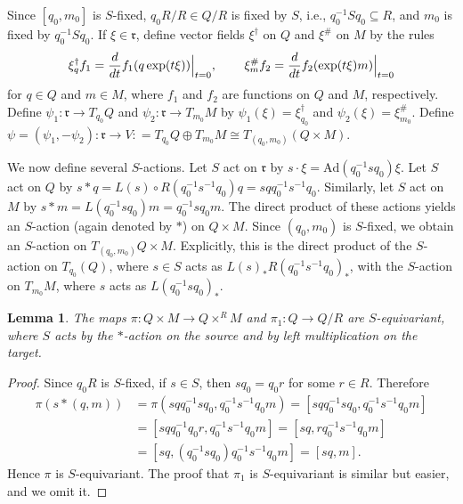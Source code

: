 \documentclass[11pt,letterpaper,reqno]{amsart}
\newcommand{\fr}{{\mathfrak r}}
\numberwithin{equation}{section}
\theoremstyle{plain}
\newtheorem{lemma}[theorem]{Lemma}
\theoremstyle{definition}
\theoremstyle{remark}
\newcommand{\Ad}{\mathrm{Ad}}
\begin{document}
Since $[q_0, m_0]$ is $S$-fixed, $q_0 R/R \in Q/R$ is fixed by $S$, i.e., $q_0^{-1} S q_0 \subseteq R$,
and $m_0$ is fixed by $q_0^{-1} S q_0$.  If $\xi \in \fr$, define vector fields $\xi^{\dagger}$ on $Q$ and $\xi^{\#}$ on $M$ by the rules
\begin{equation}
\xi^{\dagger}_q f_1 = \frac{d}{dt} f_1(q \exp (t \xi)) \Big|_{t=0}, \hspace{.3in} \xi^{\#}_m f_2  = \frac{d}{dt} f_2(\exp (t \xi) m) \Big|_{t=0} 
\end{equation}
for $q\in Q$ and $m\in M$, where $f_1$ and $f_2$ are functions on $Q$ and $M$, respectively.
Define $\psi_1: \fr \to T_{q_0} Q$ and $\psi_2: \fr \to T_{m_0}M$ by $\psi_1(\xi) = {\xi}^{\dagger}_{q_0}$ and
$\psi_2(\xi) = \xi^{\#}_{m_0}$.  Define $\psi = (\psi_1, - \psi_2) : \fr \to V : = T_{q_0} Q \oplus T_{m_0}M \cong T_{(q_0, m_0)} (Q \times M)$.

We now define several $S$-actions.
Let $S$ act on $\fr$ by 
$s \cdot \xi = \Ad (q_0^{-1} s q_0) \xi$.  
Let $S$ act on $Q$ by $s*q = L(s) \circ R(q_0^{-1} s^{-1} q_0) q = s q q_0^{-1} s^{-1} q_0$. 
Similarly, let $S$ act on $M$ by $s*m = L(q_0^{-1} s q_0) m = q_0^{-1} s q_0 m$. 
The direct product of these actions yields an $S$-action (again denoted by $*$) on $Q \times M$.
Since $(q_0,m_0)$ is $S$-fixed, we obtain an $S$-action on $T_{(q_0, m_0)} Q \times M$.
Explicitly, this is the direct product of the $S$-action
on $T_{q_0}(Q)$, where $s \in S$ acts as $L(s)_* R(q_0^{-1} s^{-1} q_0)_*$, with
the $S$-action on $T_{m_0}M$, where $s$ acts as $L(q_0^{-1} s q_0)_*$.


\begin{lemma} \label{l:equivariant}
The maps $\pi: Q \times M \to Q \times^R M$ and $\pi_1: Q \to Q/R$ are $S$-equivariant, where $S$ acts by the $*$-action on the source
and by left multiplication on the target.
\end{lemma}

\begin{proof}
Since $q_0 R$ is $S$-fixed, if $s \in S$, then $s q_0 = q_0 r$ for some $r \in R$.  Therefore
\begin{align*}
\pi(s*(q,m)) & = \pi(s q q_0^{-1} s q_0, q_0^{-1} s^{-1} q_0 m) = [s q q_0^{-1} s q_0, q_0^{-1} s^{-1}  q_0 m] \\
& = [s q q_0^{-1} q_0 r, q_0^{-1} s^{-1}  q_0 m] =  [s q , r q_0^{-1} s^{-1}  q_0 m] \\
& = [sq, (q_0^{-1} s q_0) q_0^{-1} s^{-1}  q_0 m] = [sq, m].
\end{align*}
Hence $\pi$ is $S$-equivariant.  The proof that $\pi_1$ is $S$-equivariant is similar but easier, and we omit it.
\end{proof}
\end{document}
